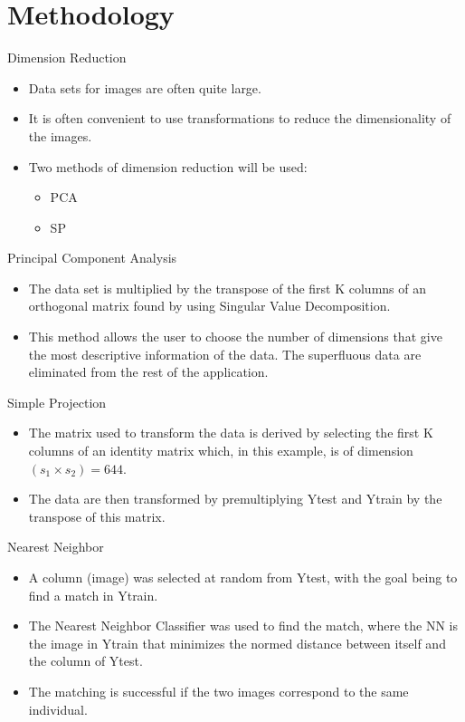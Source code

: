 \documentclass[pdf]{beamer}
\begin{document}
\section{Methodology}
\begin{frame}{Dimension Reduction}
\begin{itemize}
\item Data sets for images are often quite large.
\item It is often convenient to use transformations to reduce the dimensionality of the images.
\item Two methods of dimension reduction will be used:
\begin{itemize}
\item PCA
\item SP
\end{itemize}
\end{itemize}
\end{frame}

\begin{frame}{Principal Component Analysis}
\begin{itemize}
\item The data set is multiplied by the transpose of the first K columns of an orthogonal matrix found by using Singular Value Decomposition.
\item This method allows the user to choose the number of dimensions that give the most descriptive information of the data. The superfluous data are eliminated from the rest of the application.
\end{itemize} 
\end{frame}

\begin{frame}{Simple Projection}
\begin{itemize}
\item The matrix used to transform the data is derived by selecting the first K columns of an identity matrix which, in this example, is of dimension $(s_{1} \times s_{2})=644$.
\item The data are then transformed by premultiplying Ytest and Ytrain by the transpose of this matrix.
\end{itemize}
\end{frame}

\begin{frame}{Nearest Neighbor}
\begin{itemize}
\item A column (image) was selected at random from Ytest, with the goal being to find a match in Ytrain.
\item The Nearest Neighbor Classifier was used to find the match, where the NN is the image in Ytrain that minimizes the normed distance between itself and the column of Ytest. 
\item The matching is successful if the two images correspond to the same individual.
\end{itemize}
\end{frame}
\end{document}
